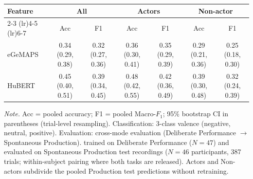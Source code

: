 \begin{tabular}{lcccccc}
\toprule
Feature & \multicolumn{2}{c}{All} & \multicolumn{2}{c}{Actors} & \multicolumn{2}{c}{Non-actor} \\
\cmidrule(lr){2-3} \cmidrule(lr){4-5} \cmidrule(lr){6-7}
 & Acc & F1 & Acc & F1 & Acc & F1 \\
\midrule
eGeMAPS & 0.34 (0.29, 0.38) & 0.32 (0.27, 0.36) & 0.36 (0.30, 0.41) & 0.35 (0.29, 0.39) & 0.29 (0.21, 0.36) & 0.25 (0.18, 0.30) \\
HuBERT & 0.45 (0.40, 0.51) & 0.39 (0.34, 0.45) & 0.48 (0.42, 0.55) & 0.42 (0.36, 0.49) & 0.39 (0.30, 0.48) & 0.32 (0.24, 0.39) \\
\bottomrule
\end{tabular}
\par\smallskip\noindent\scriptsize\textit{Note.} Acc = pooled accuracy; F1 = pooled Macro-$F_1$; 95\% bootstrap CI in parentheses (trial-level resampling). Classification: 3-class valence (negative, neutral, positive). Evaluation: cross-mode evaluation (Deliberate Performance $\rightarrow$ Spontaneous Production). trained on Deliberate Performance ($N=47$) and evaluated on Spontaneous Production test recordings ($N=46$ participants, 387 trials; within-subject pairing where both tasks are released). Actors and Non-actors subdivide the pooled Production test predictions without retraining.